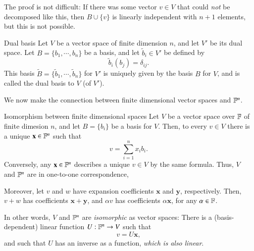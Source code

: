 The proof is not difficult: If there was some vector $v\in V$ that could \emph{not} be decomposed like this, then $B \cup \{v\}$ is linearly independent with $n+1$ elements, but this is not possible.



\begin{myDefinition}{Dual basis}{}
    Let $V$ be a vector space of finite dimension $n$, and let $V'$ be its dual space. Let $B = \{ b_1, \cdots, b_n\}$ be a basis, and let $\tilde{b}_i \in V'$ be defined by
    \[ \tilde{b}_i(b_j) = \delta_{ij}. \]
    This basis $\tilde{B} = \{ \tilde{b}_1, \cdots, \tilde{b}_n \}$ for $V'$ is uniquely given by the basis $B$ for $V$, and is called the dual basis to $V$ (of $V'$).
\end{myDefinition}

We now make the connection between finite dimensional vector spaces and $\mathbb{F}^n$.
\begin{myTheorem}{Isomorphism between finite dimensional spaces}{}
    Let $V$ be a vector space over $\mathbb{F}$ of finite dimesion $n$, and let $B=\{b_i\}$ be a basis for $V$. Then, to every $v \in V$ there is a unique $\mathbf{x} \in \mathbb{F}^n$ such that
    \begin{equation}
        v = \sum_{i=1}^n x_i b_i.
    \end{equation}
    Conversely, any $\mathbf{x}\in\mathbb{F}^n$ describes a unique $v \in V$ by the same formula. Thus, $V$ and $\mathbb{F}^n$ are in one-to-one correspondence,

    Moreover, let $v$ and $w$ have expansion coefficients $\mathbf{x}$ and $\mathbf{y}$, respectively. Then, $v + w$ has coefficients $\mathbf{x}+\mathbf{y}$, and $\alpha v$ has coefficients $\alpha \mathbf{x}$, for any $\alpha \in \mathbb{F}$.

    In other words, $V$ and $\mathbb{F}^n$ are \emph{isomorphic} as vector spaces: There is a (basis-dependent) linear function $U : \mathbb{F}^n \to V$ such that
        \[ v = U \mathbf{x}, \]
    and such that $U$ has an inverse as a function, \emph{which is also linear}.
\end{myTheorem}

